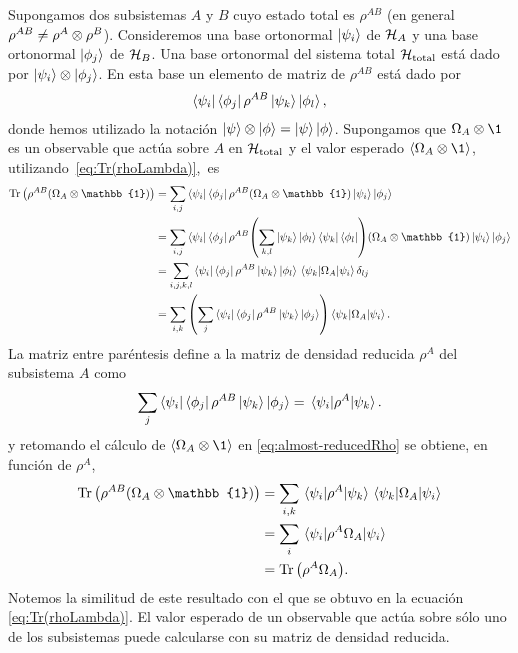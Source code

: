 Supongamos dos subsistemas $A$ y $B$ cuyo estado total es 
$\rho^{AB}$ (en general $\rho^{AB}\neq \rho^A\otimes \rho^B$). 
Consideremos una base ortonormal $\ket{\psi_i}$ de $\mathcal{H}_A$ y una 
base ortonormal $\ket{\phi_j}$ de $\mathcal{H}_B$. Una base ortonormal 
del sistema total $\mathcal{H}_{\text{total}}$ está dado 
por $\ket{\psi_i}\otimes \ket{\phi_j}$.
En esta base un elemento de matriz de $\rho^{AB}$ está dado por
\begin{align}
	\bra{\psi_i}\bra{\phi_j}\rho^{AB}\ket{\psi_k}\ket{\phi_l},
\end{align}
donde hemos utilizado la notación 
$\ket{\psi}\otimes\ket{\phi}=\ket{\psi}\ket{\phi}$.
Supongamos que $\Omega_A\ot \1$ es un observable que actúa sobre $A$
en $\mathcal{H}_{\text{total}}$ y el valor esperado 
$\expval{\Omega_A\ot \1}$, utilizando~\eqref{eq:Tr(rhoLambda)},~es
\begin{align}
	\Tr \qty(\rho^{AB}\qty(\Omega_A\ot \mathbb{1})) &= \sum _{i,j} 
	\bra{\psi_i}\bra{\phi_j}\rho^{AB}\qty(\Omega_A\ot \mathbb{1})
	\ket{\psi_i}\ket{\phi_j} 
	\nonumber\\
	&= \sum _{i,j} 
	\bra{\psi_i} \bra{\phi_j}\rho^{AB}
	\qty(\sum _{k,l} \ket{\psi_k} \ket{\phi_l} \bra{\psi_k}\bra{\phi_l} )
	\qty(\Omega_A\ot \mathbb{1})\ket{\psi_i} \ket{\phi_j}\nonumber\\
	&= \sum _{i,j,k,l} 
	\bra{\psi_i} \bra{\phi_j}\rho^{AB}\ket{\psi_k} \ket{\phi_l}
	\matrixel{\psi_k}{\Omega_A}{\psi_i}\delta _{lj}\nonumber\\
	&= \sum_{i,k}\qty(\sum _j 
	\bra{\psi_i} \bra{\phi_j}\rho^{AB}\ket{\psi_k} \ket{\phi_j})
	\matrixel{\psi_k}{\Omega_A}{\psi_i}.
	\label{eq:almost-reducedRho}
\end{align}
La matriz entre paréntesis define a la matriz de densidad
reducida $\rho^A$ del subsistema $A$ como~\cite{chandra2013quantum}
\begin{align}
	\sum _j \bra{\psi_i}\bra{\phi_j}\rho^{AB}\ket{\psi_k}\ket{\phi_j}
	= \matrixel{\psi_i}{\rho^A}{\psi_k}.
	\label{eq:reducedRho-def1}
\end{align}
y retomando el cálculo de $\expval{\Omega_A\ot \1}$
en \eqref{eq:almost-reducedRho} se obtiene, en función de $\rho^A$,
\begin{align}
	\Tr \qty(\rho^{AB}\qty(\Omega_A\ot \mathbb{1}))&= \sum _{i,k}\nonumber
	\matrixel{\psi_i}{\rho^A}{\psi_k} \matrixel{\psi_k}{\Omega_A}{\psi_i}
	\nonumber\\
	&= \sum_i \matrixel{\psi_i}{\rho^A\Omega_A}{\psi_i}\nonumber\\
	&= \Tr \qty(\rho^A\Omega_A). \label{eq:reduced-works}
\end{align}
Notemos la similitud de este resultado con el que se obtuvo en la ecuación
\eqref{eq:Tr(rhoLambda)}. El valor esperado de un observable que actúa 
sobre sólo uno de los subsistemas puede calcularse con su matriz de 
densidad reducida.

